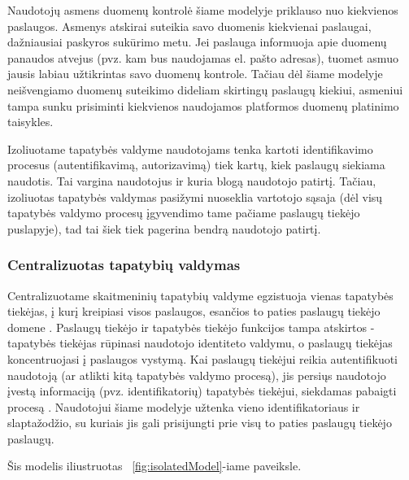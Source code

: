 Naudotojų asmens duomenų kontrolė šiame modelyje priklauso nuo kiekvienos paslaugos. Asmenys atskirai suteikia savo duomenis
kiekvienai paslaugai, dažniausiai paskyros sukūrimo metu. Jei paslauga informuoja apie duomenų panaudos atvejus (pvz. kam bus naudojamas
el. pašto adresas), tuomet asmuo jausis labiau užtikrintas savo duomenų kontrole. Tačiau dėl šiame modelyje neišvengiamo duomenų suteikimo
dideliam skirtingų paslaugų kiekiui, asmeniui tampa sunku prisiminti kiekvienos naudojamos platformos duomenų platinimo taisykles.

Izoliuotame tapatybės valdyme naudotojams tenka kartoti identifikavimo procesus (autentifikavimą, autorizavimą) tiek kartų, kiek paslaugų siekiama
naudotis. Tai vargina naudotojus ir kuria blogą naudotojo patirtį. Tačiau, izoliuotas tapatybės valdymas pasižymi nuoseklia vartotojo sąsaja (dėl 
visų tapatybės valdymo procesų įgyvendimo tame pačiame paslaugų tiekėjo puslapyje), tad tai šiek tiek pagerina bendrą naudotojo patirtį.

\subsubsection{Centralizuotas tapatybių valdymas}

Centralizuotame skaitmeninių tapatybių valdyme egzistuoja vienas tapatybės tiekėjas, į kurį kreipiasi visos paslaugos,
esančios to paties paslaugų tiekėjo domene \cite{Josang2005}. Paslaugų tiekėjo ir tapatybės tiekėjo funkcijos tampa atskirtos - 
tapatybės tiekėjas rūpinasi naudotojo identiteto valdymu, o paslaugų tiekėjas koncentruojasi į paslaugos vystymą. Kai paslaugų tiekėjui
reikia autentifikuoti naudotoją (ar atlikti kitą tapatybės valdymo procesą), jis persiųs naudotojo įvestą informaciją (pvz. identifikatorių) tapatybės tiekėjui,
siekdamas pabaigti procesą \cite{Cao2010}. Naudotojui šiame modelyje užtenka vieno identifikatoriaus ir slaptažodžio, su kuriais jis gali prisijungti prie visų to paties
paslaugų tiekėjo paslaugų.

Šis modelis iliustruotas ~\ref{fig:isolatedModel}-iame paveiksle.



